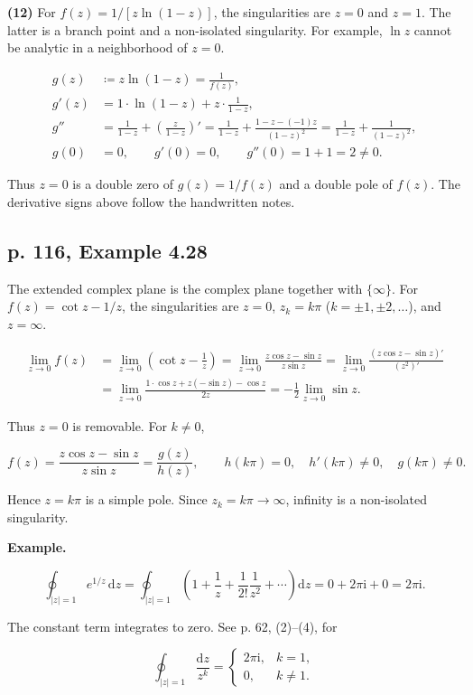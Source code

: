 \documentclass[11pt,a4paper]{article}
\theoremstyle{definition}
\theoremstyle{plain}
\begin{document}
\textbf{(12)} For $f(z)=1/[z\ln(1-z)]$, the singularities are $z=0$ and $z=1$. The latter is a branch point and a non-isolated singularity. For example, $\ln z$ cannot be analytic in a neighborhood of $z=0$.

\[
\begin{aligned}
g(z)&\coloneqq z\ln(1-z)=\frac1{f(z)},\\
g'(z)&=1\cdot\ln(1-z)+z\cdot\frac1{1-z},\\
g''&=\frac1{1-z}+\left(\frac z{1-z}\right)'
=\frac1{1-z}+\frac{1-z-(-1)z}{(1-z)^2}
=\frac1{1-z}+\frac1{(1-z)^2},\\
g(0)&=0,\qquad g'(0)=0,\qquad g''(0)=1+1=2\ne0.
\end{aligned}
\]

Thus $z=0$ is a double zero of $g(z)=1/f(z)$ and a double pole of $f(z)$. The derivative signs above follow the handwritten notes.


\subsection{p. 116, Example 4.28}

The extended complex plane is the complex plane together with $\{\infty\}$. For $f(z)=\cot z-1/z$, the singularities are $z=0$, $z_k=k\pi$ ($k=\pm1,\pm2,\ldots$), and $z=\infty$.

\[
\begin{aligned}
\lim_{z\to0}f(z)
&=\lim_{z\to0}\left(\cot z-\frac1z\right)
=\lim_{z\to0}\frac{z\cos z-\sin z}{z\sin z}
=\lim_{z\to0}\frac{(z\cos z-\sin z)'}{(z^2)'}\\
&=\lim_{z\to0}\frac{1\cdot\cos z+z(-\sin z)-\cos z}{2z}
=-\frac12\lim_{z\to0}\sin z.
\end{aligned}
\]

Thus $z=0$ is removable. For $k\ne0$,

\[
f(z)=\frac{z\cos z-\sin z}{z\sin z}=\frac{g(z)}{h(z)},\qquad
h(k\pi)=0,\quad h'(k\pi)\ne0,\quad g(k\pi)\ne0.
\]

Hence $z=k\pi$ is a simple pole. Since $z_k=k\pi\to\infty$, infinity is a non-isolated singularity.

\textbf{Example.}

\[
\oint_{|z|=1}e^{1/z}\,\mathrm{d}z
=\oint_{|z|=1}\left(1+\frac1z+\frac1{2!}\frac1{z^2}+\cdots\right)\mathrm{d}z
=0+2\pi \mathrm{i}+0=2\pi \mathrm{i}.
\]

The constant term integrates to zero. See p. 62, (2)--(4), for

\[
\oint_{|z|=1}\frac{\mathrm{d}z}{z^k}=
\begin{cases}2\pi \mathrm{i},& k=1,\\0,& k\ne1.\end{cases}
\]
\end{document}
